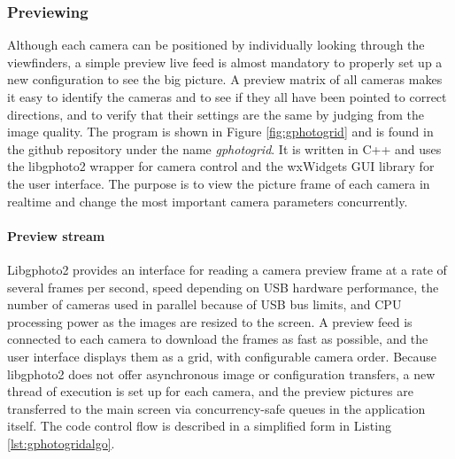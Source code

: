 
\subsubsection{Previewing} %



Although each camera can be positioned by individually looking through the viewfinders, a simple preview live feed is almost mandatory to properly set up a new configuration to see the big picture.
A preview matrix of all cameras makes it easy to identify the cameras and to see if they all have been pointed to correct directions, and to verify that their settings are the same by judging from the image quality.
The program is shown in Figure \ref{fig:gphotogrid} and is found in the github repository under the name \emph{gphotogrid}.
It is written in C++ and uses the libgphoto2 wrapper for camera control and the wxWidgets GUI library \cite{wxwidgets} for the user interface.
The purpose is to view the picture frame of each camera in realtime and change the most important camera parameters concurrently.

\paragraph{Preview stream}
Libgphoto2 provides an interface for reading a camera preview frame at a rate of several frames per second, speed depending on USB hardware performance, the number of cameras used in parallel because of USB bus limits, and CPU processing power as the images are resized to the screen.
A preview feed is connected to each camera to download the frames as fast as possible, and the user interface displays them as a grid, with configurable camera order.
Because libgphoto2 does not offer asynchronous image or configuration transfers, a new thread of execution is set up for each camera, and the preview pictures are transferred to the main screen via concurrency-safe queues in the application itself.
The code control flow is described in a simplified form in Listing \ref{lst:gphotogridalgo}.

